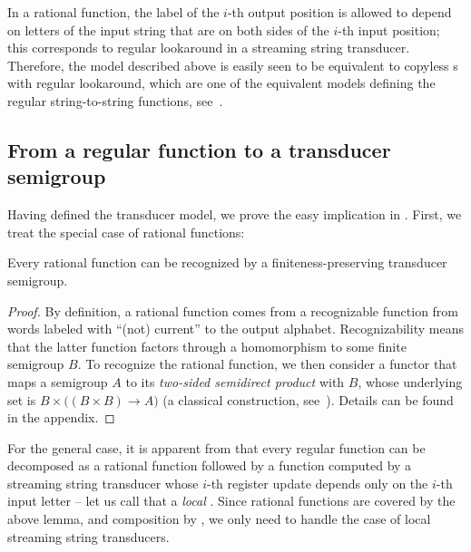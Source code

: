 In a rational function, the label of the $i$-th output position is allowed to depend on letters of the input string that are on both sides of the $i$-th input position; this corresponds to regular lookaround in a streaming string transducer. Therefore, the model described above is easily seen to be equivalent to copyless \sst{}s with regular lookaround, which are one of the equivalent models defining the regular string-to-string functions, see~\cite[Section~IV.C]{AlurFT12}.

\subsection{From a regular function to a transducer semigroup}
\label{sec:easy}

Having defined the transducer model, we prove the easy implication in
. First, we treat the special case of rational
functions:
\begin{lemma}\label{lem:rational-to-functor}
  Every rational function can be recognized by a finiteness-preserving
  transducer semigroup.
\end{lemma}
\begin{proof}
  By definition, a rational function comes from a recognizable function from
  words labeled with \enquote{(not) current} to the output alphabet.
  Recognizability means that the latter function factors through a homomorphism
  to some finite semigroup $B$. To recognize the rational function, we then
  consider a functor that maps a semigroup $A$ to its \emph{two-sided semidirect
    product} with $B$, whose underlying set is $B \times \big((B \times B) \to
  A\big)$ (a classical construction, see~\cite[Section 6]{rhodes1989kernel}).
  Details can be found in the appendix.
\end{proof}

For the general case, it is apparent from  that every
regular function can be decomposed as a rational function followed by a function
computed by a streaming string transducer whose $i$-th register update depends
only on the $i$-th input letter -- let us call that a \emph{local} \sst. Since
rational functions are covered by the above lemma, and composition by
, we only need to handle the case of local streaming
string transducers.


